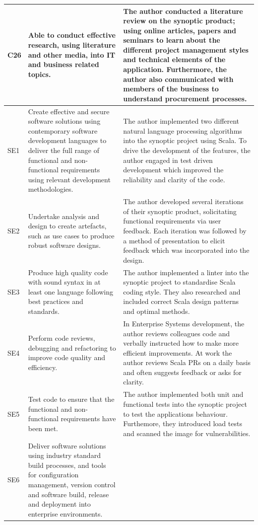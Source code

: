 \documentclass{article}
\begin{document}
\begin{landscape}
\begin{longtable}{|l|p{10cm}|p{10cm}|}
C26 &
  Able to conduct effective   research, using literature and other media, into IT and business related   topics. &
  The author conducted a   literature review on the synoptic product; using online articles, papers and   seminars to learn about the different project management styles and technical   elements of the application. Furthermore, the author also communicated with members   of the business to understand procurement processes. \\ \hline
SE1 &
  Create effective and secure   software solutions using contemporary software development languages to   deliver the full range of functional and non-functional requirements using   relevant development methodologies. &
  The author implemented two   different natural language processing algorithms into the synoptic project   using Scala. To drive the development of the features, the author engaged in   test driven development which improved the reliability and clarity of the code. \\ \hline
SE2 &
  Undertake analysis and design   to create artefacts, such as use cases to produce robust software designs. &
  The author developed several   iterations of their synoptic product, solicitating functional requirements   via user feedback. Each iteration was followed by a method of presentation to   elicit feedback which was incorporated into the design. \\ \hline
SE3 &
  Produce high quality code with   sound syntax in at least one language following best practices and standards. &
  The author implemented a   linter into the synoptic project to standardise Scala coding style. They also   researched and included correct Scala design patterns and optimal methods. \\ \hline
SE4 &
  Perform code reviews,   debugging and refactoring to improve code quality and efficiency. &
  In Enterprise Systems   development, the author reviews colleagues code and verbally instructed how   to make more efficient improvements. At work the author reviews Scala PRs on   a daily basis and often suggests feedback or asks for clarity. \\ \hline
SE5 &
  Test code to ensure that the   functional and non-functional requirements have been met. &
  The author implemented both   unit and functional tests into the synoptic project to test the applications   behaviour. Furthemore, they introduced load tests and scanned the image for   vulnerabilities. \\ \hline
SE6 &
  Deliver software solutions   using industry standard build processes, and tools for configuration   management, version control and software build, release and deployment into   enterprise environments. &

\end{longtable}
\end{landscape}
\end{document}
